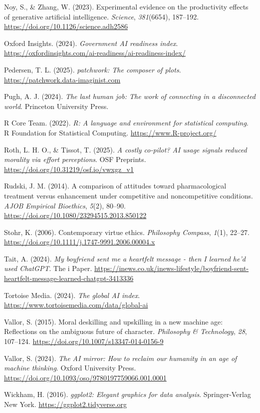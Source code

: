 \documentclass[
  man,
  floatsintext,
  longtable,
  nolmodern,
  notxfonts,
  notimes,
  colorlinks=true,linkcolor=blue,citecolor=blue,urlcolor=blue]{apa7}
\newlength{\cslhangindent}
\newenvironment{CSLReferences}[2] %
 {\begin{list}{}{%
  \setlength{\itemindent}{0pt}
  \setlength{\leftmargin}{0pt}
  \setlength{\parsep}{0pt}
  \ifodd #1
   \setlength{\leftmargin}{\cslhangindent}
   \setlength{\itemindent}{-1\cslhangindent}
  \fi
  \setlength{\itemsep}{#2\baselineskip}}}
 {\end{list}}
\begin{document}
\begin{CSLReferences}{1}{0}
Noy, S., \& Zhang, W. (2023). Experimental evidence on the productivity
effects of generative artificial intelligence. \emph{Science},
\emph{381}(6654), 187--192.
\url{https://doi.org/10.1126/science.adh2586}

Oxford Insights. (2024). \emph{Government {AI} readiness index}.
\url{https://oxfordinsights.com/ai-readiness/ai-readiness-index/}

Pedersen, T. L. (2025). \emph{{patchwork}: The composer of plots}.
\url{https://patchwork.data-imaginist.com}

Pugh, A. J. (2024). \emph{The last human job: The work of connecting in
a disconnected world}. Princeton University Press.

R Core Team. (2022). \emph{R: A language and environment for statistical
computing}. R Foundation for Statistical Computing.
\url{https://www.R-project.org/}

Roth, L. H. O., \& Tissot, T. (2025). \emph{A costly co-pilot? {AI}
usage signals reduced morality via effort perceptions}. OSF Preprints.
\url{https://doi.org/10.31219/osf.io/vwxgz_v1}

Rudski, J. M. (2014). A comparison of attitudes toward pharmacological
treatment versus enhancement under competitive and noncompetitive
conditions. \emph{AJOB Empirical Bioethics}, \emph{5}(2), 80--90.
\url{https://doi.org/10.1080/23294515.2013.850122}

Stohr, K. (2006). Contemporary virtue ethics. \emph{Philosophy Compass},
\emph{1}(1), 22--27.
\url{https://doi.org/10.1111/j.1747-9991.2006.00004.x}

Tait, A. (2024). \emph{{M}y boyfriend sent me a heartfelt message - then
{I} learned he'd used {ChatGPT}}. The i Paper.
\url{https://inews.co.uk/inews-lifestyle/boyfriend-sent-heartfelt-message-learned-chatgpt-3413336}

Tortoise Media. (2024). \emph{The global {AI} index}.
\url{https://www.tortoisemedia.com/data/global-ai}

Vallor, S. (2015). Moral deskilling and upskilling in a new machine age:
Reflections on the ambiguous future of character. \emph{Philosophy \&
Technology}, \emph{28}, 107--124.
\url{https://doi.org/10.1007/s13347-014-0156-9}

Vallor, S. (2024). \emph{The {AI} mirror: How to reclaim our humanity in
an age of machine thinking}. Oxford University Press.
\url{https://doi.org/10.1093/oso/9780197759066.001.0001}

Wickham, H. (2016). \emph{{ggplot2}: Elegant graphics for data
analysis}. Springer-Verlag New York. \url{https://ggplot2.tidyverse.org}

\end{CSLReferences}
\end{document}
